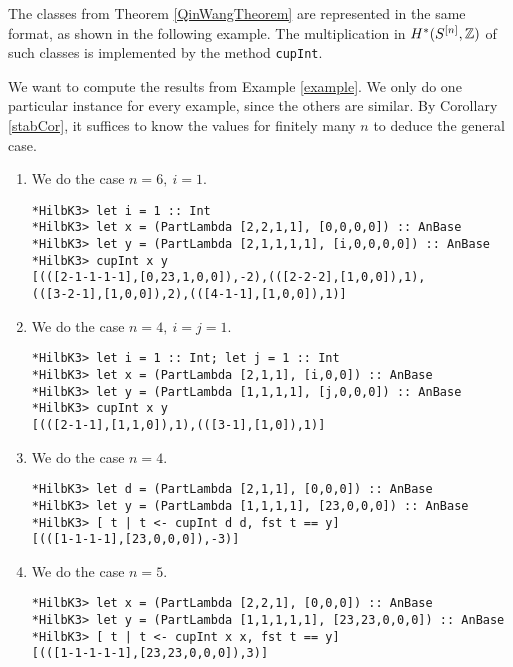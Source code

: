 The classes from Theorem \ref{QinWangTheorem} are represented in the same format, as shown in the following example. The multiplication in $H^*(S^{[n]},\mathbb{Z})$ of such classes is implemented by the method \verb|cupInt|.
\begin{example}\label{exampleSource} We want to compute the results from Example \ref{example}. We only do one particular instance for every example, since the others are similar. By Corollary \ref{stabCor}, it suffices to know the values for finitely many $n$ to deduce the general case.
\begin{enumerate}
\item We do the case $n=6,\ i=1$. 
\begin{Verbatim}[fontsize=\small]
*HilbK3> let i = 1 :: Int
*HilbK3> let x = (PartLambda [2,2,1,1], [0,0,0,0]) :: AnBase
*HilbK3> let y = (PartLambda [2,1,1,1,1], [i,0,0,0,0]) :: AnBase
*HilbK3> cupInt x y
[(([2-1-1-1-1],[0,23,1,0,0]),-2),(([2-2-2],[1,0,0]),1),
(([3-2-1],[1,0,0]),2),(([4-1-1],[1,0,0]),1)]
\end{Verbatim}
\item We do the case $n=4,\ i=j=1$. 
\begin{Verbatim}[fontsize=\small]
*HilbK3> let i = 1 :: Int; let j = 1 :: Int
*HilbK3> let x = (PartLambda [2,1,1], [i,0,0]) :: AnBase
*HilbK3> let y = (PartLambda [1,1,1,1], [j,0,0,0]) :: AnBase
*HilbK3> cupInt x y
[(([2-1-1],[1,1,0]),1),(([3-1],[1,0]),1)]
\end{Verbatim}
\item We do the case $n=4$. 
\begin{Verbatim}[fontsize=\small]
*HilbK3> let d = (PartLambda [2,1,1], [0,0,0]) :: AnBase
*HilbK3> let y = (PartLambda [1,1,1,1], [23,0,0,0]) :: AnBase
*HilbK3> [ t | t <- cupInt d d, fst t == y]
[(([1-1-1-1],[23,0,0,0]),-3)]
\end{Verbatim}
\item We do the case $n=5$. 
\begin{Verbatim}[fontsize=\small]
*HilbK3> let x = (PartLambda [2,2,1], [0,0,0]) :: AnBase
*HilbK3> let y = (PartLambda [1,1,1,1,1], [23,23,0,0,0]) :: AnBase
*HilbK3> [ t | t <- cupInt x x, fst t == y]
[(([1-1-1-1-1],[23,23,0,0,0]),3)]
\end{Verbatim}
\end{enumerate}
\end{example}

